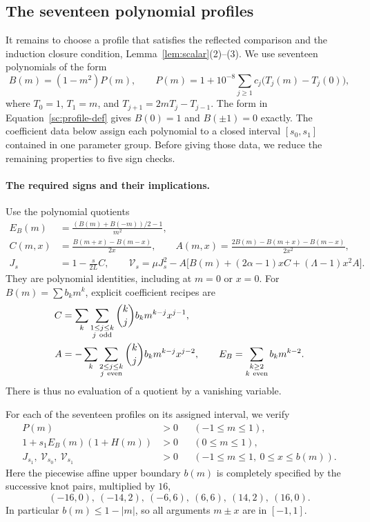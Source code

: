 \subsection{The seventeen polynomial profiles}\label{sc:profiles}

It remains to choose a profile that satisfies the reflected comparison
and the induction closure condition, Lemma~\ref{lem:scalar}(2)--(3).
We use seventeen polynomials of the form
\begin{equation}\label{sc:profile-def}
 B(m)=(1-m^2)P(m),\qquad
 P(m)=1+10^{-8}\sum_{j\geq1}c_j\bigl(T_j(m)-T_j(0)\bigr),
\end{equation}
where $T_0=1$, $T_1=m$, and $T_{j+1}=2mT_j-T_{j-1}$.
The form in Equation~\eqref{sc:profile-def} gives $B(0)=1$ and $B(\pm1)=0$
exactly.  The coefficient data below assign each polynomial to a closed
interval $[s_0,s_1]$ contained in one parameter group.  Before giving
those data, we reduce the remaining properties to five sign checks.

\paragraph{The required signs and their implications.}
Use the polynomial quotients
\begin{align}
 E_B(m)&=\frac{(B(m)+B(-m))/2-1}{m^2},\nonumber\\
 C(m,x)&=\frac{B(m+x)-B(m-x)}{2x},\qquad
 A(m,x)=\frac{2B(m)-B(m+x)-B(m-x)}{2x^2},\label{sc:quotients}\\
 J_s&=1-\frac{s}{2L}C,\qquad
 \mathcal V_s=\mu J_s^2
       -A\bigl[B(m)+(2\alpha-1)xC+(\Lambda-1)x^2A\bigr].\nonumber
\end{align}
They are polynomial identities, including at $m=0$ or $x=0$.
For $B(m)=\sum b_km^k$, explicit coefficient recipes are
\begin{align*}
 C&=\sum_k\sum_{\substack{1\leq j\leq k\\j\ {\rm odd}}}
       \binom{k}{j}b_km^{k-j}x^{j-1},\\
 A&=-\sum_k\sum_{\substack{2\leq j\leq k\\j\ {\rm even}}}
       \binom{k}{j}b_km^{k-j}x^{j-2},\qquad
 E_B=\sum_{\substack{k\geq2\\k\ {\rm even}}}b_km^{k-2}.
\end{align*}
There is thus no evaluation of a quotient by a vanishing variable.

For each of the seventeen profiles on its assigned interval, we verify
\begin{align}
 P(m)&>0 &&(-1\leq m\leq1),\nonumber\\
 1+s_1E_B(m)(1+H(m))&>0 &&(0\leq m\leq1),\label{sc:profile-signs}\\
 J_{s_1},\ \mathcal V_{s_0},\ \mathcal V_{s_1}&>0
       &&(-1\leq m\leq1,\ 0\leq x\leq b(m)).\nonumber
\end{align}
Here the piecewise affine upper boundary $b(m)$ is completely specified
by the successive knot pairs, multiplied by $16$,
\begin{equation}\label{sc:knots}
 (-16,0),\ (-14,2),\ (-6,6),\ (6,6),\ (14,2),\ (16,0).
\end{equation}
In particular $b(m)\leq1-|m|$, so all arguments $m\pm x$ are in $[-1,1]$.

